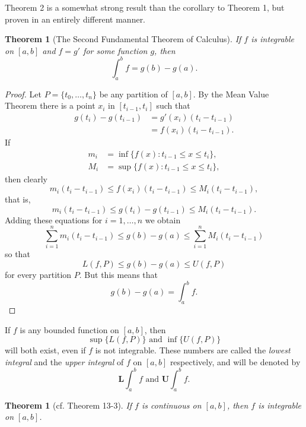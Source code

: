 \documentclass{article}
\numberwithin{corollary}{subsection}
\numberwithin{definition}{subsection}
\numberwithin{lemma}{subsection}
\newtheorem{theorem}{Theorem}
\numberwithin{theorem}{subsection}
\newtheorem*{theorem*}{Theorem}
\begin{document}
Theorem 2 is a somewhat strong result than the corollary to Theorem 1, but
proven in an entirely different manner.

\begin{theorem}[The Second Fundamental Theorem of Calculus]
  If $f$ is integrable on $[a, b]$ and $f = g'$ for some function $g$, then \[
    \int_a^b f = g(b) - g(a).
  \]
\end{theorem}
\begin{proof}
  Let $P = \{t_0, \ldots, t_n\}$ be any partition of $[a, b]$. By the Mean
  Value Theorem there is a point $x_i$ in $[t_{i-1}, t_i]$ such that
  \begin{align*}
    g(t_i) - g(t_{i-1})
    &= g'(x_i)(t_i - t_{i-1}) \\
    &= f(x_i)(t_i - t_{i-1}).
  \end{align*}
  If
  \begin{align*}
    m_i &= \inf\{f(x): t_{i-1} \leq x \leq t_i\}, \\
    M_i &= \sup\{f(x): t_{i-1} \leq x \leq t_i\},
  \end{align*}
  then clearly \[
    m_i(t_i - t_{i-1}) \leq f(x_i)(t_i - t_{i-1}) \leq M_i(t_i - t_{i-1}),
  \] that is, \[
    m_i(t_i - t_{i-1}) \leq g(t_i) - g(t_{i-1}) \leq M_i(t_i - t_{i-1}).
  \] Adding these equations for $i = 1, \ldots, n$ we obtain \[
    \sum_{i=1}^n m_i(t_i - t_{i-1})
    \leq g(b) - g(a)
    \leq \sum_{i=1}^n M_i(t_i - t_{i-1})
  \] so that \[
    L(f, P) \leq g(b) - g(a) \leq U(f, P)
  \] for every partition $P$. But this means that \[
    g(b) - g(a) = \int_a^b f.
  \]
\end{proof}

If $f$ is any bounded function on $[a, b]$, then \[
  \sup\{L(f, P)\} \text{ and } \inf\{U(f, P)\}
\] will both exist, even if $f$ is not integrable. These numbers
are called the \emph{lowest integral} and the \emph{upper integral} of $f$ on
$[a, b]$ respectively, and will be denoted by \[
  \textbf{L}\int_a^b f \text{ and } \textbf{U}\int_a^b f.
\]

\begin{theorem*}[cf. Theorem 13-3]
  If $f$ is continuous on $[a, b]$, then $f$ is integrable on $[a, b]$.
\end{theorem*}
\end{document}
